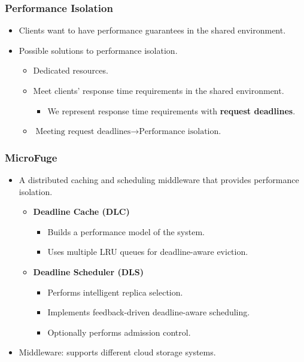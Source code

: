 \documentclass{beamer}
\newcommand{\myv}{\vspace{3 mm}}
\begin{document}
\begin{frame}
  \frametitle{Performance Isolation}
  \begin{itemize}
  \item Clients want to have performance guarantees in the shared
    environment. \myv
  \item Possible solutions to performance isolation.
    \myv
    \begin{itemize}
    \item Dedicated resources.
      \myv
    \item Meet clients' response time requirements in the shared environment.
      \myv
      \begin{itemize}
      \item We represent response time requirements with \textbf{request deadlines}.
      \end{itemize}
      \myv
    \item \(\text{Meeting request deadlines} \rightarrow \text{Performance isolation.}\)
    \end{itemize}
  \end{itemize}
\end{frame}

\begin{frame}
  \frametitle{MicroFuge}
  \begin{itemize}
  \item A distributed caching and scheduling middleware that provides
    performance isolation.
    \myv
    \begin{itemize}
    \item \textbf{Deadline Cache (DLC)}
      \myv
      \begin{itemize}
      \item Builds a performance model of the system.
        \myv
      \item Uses multiple LRU queues for deadline-aware eviction.
        \myv
      \end{itemize}
    \item \textbf{Deadline Scheduler (DLS)}
      \begin{itemize}
        \myv
      \item Performs intelligent replica selection.
        \myv
      \item Implements feedback-driven deadline-aware scheduling.
        \myv
      \item Optionally performs admission control.
      \end{itemize}
    \end{itemize}
    \myv
  \item Middleware: supports different cloud storage systems.
  \end{itemize}
\end{frame}
\end{document}
